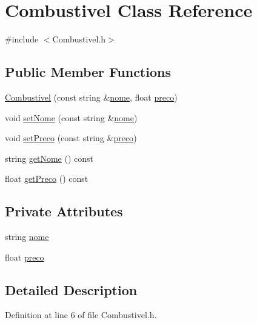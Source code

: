 \hypertarget{class_combustivel}{\section{Combustivel Class Reference}
\label{class_combustivel}
}


{\ttfamily \#include $<$Combustivel.\+h$>$}

\subsection*{Public Member Functions}
\begin{DoxyCompactItemize}
\item 
\hyperlink{class_combustivel_a101e8181fe6c4e21aa3c73cd3888467e}{Combustivel} (const string \&\hyperlink{class_combustivel_adfa329c4c4b60abcb87c1f3c82be4145}{nome}, float \hyperlink{class_combustivel_ac910a8410930ba553861f584da9f48d1}{preco})
\item 
void \hyperlink{class_combustivel_a0f1311345a421884cf290b413e1df9b4}{set\+Nome} (const string \&\hyperlink{class_combustivel_adfa329c4c4b60abcb87c1f3c82be4145}{nome})
\item 
void \hyperlink{class_combustivel_a4e041c5259267d1c8e258bfac3c55162}{set\+Preco} (const string \&\hyperlink{class_combustivel_ac910a8410930ba553861f584da9f48d1}{preco})
\item 
string \hyperlink{class_combustivel_a20ab48a38371dedfc40ca4b5e11dbb5e}{get\+Nome} () const 
\item 
float \hyperlink{class_combustivel_a7e4bbd943b0534fc2c1fdf3ce6861f14}{get\+Preco} () const 
\end{DoxyCompactItemize}
\subsection*{Private Attributes}
\begin{DoxyCompactItemize}
\item 
string \hyperlink{class_combustivel_adfa329c4c4b60abcb87c1f3c82be4145}{nome}
\item 
float \hyperlink{class_combustivel_ac910a8410930ba553861f584da9f48d1}{preco}
\end{DoxyCompactItemize}


\subsection{Detailed Description}


Definition at line 6 of file Combustivel.\+h.



